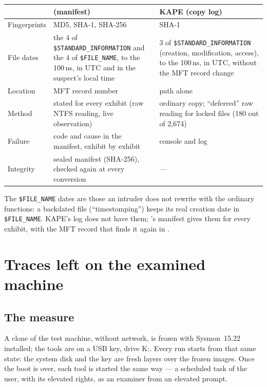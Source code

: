 \documentclass[11pt,a4paper,oneside]{report}
\begin{document}
\begin{longtable}{@{}L{3.6cm}L{6.0cm}L{5.4cm}@{}}
\toprule
 & \textbf{\wac{} (manifest)} & \textbf{KAPE (copy log)} \\
\midrule\endhead
Fingerprints & MD5, SHA-1, SHA-256 & SHA-1 \\
File dates & the 4 of \texttt{\$STANDARD\_INFORMATION} and the 4 of
  \texttt{\$FILE\_NAME}, to the 100\,ns, in UTC and in the suspect's local
  time & 3 of \texttt{\$STANDARD\_INFORMATION} (creation, modification,
  access), to the 100\,ns, in UTC, without the MFT record change \\
Location & MFT record number & path alone \\
Method & stated for every exhibit (raw NTFS reading, live observation) &
  ordinary copy; ``deferred'' raw reading for locked files (180 out of 2,674) \\
Failure & code and cause in the manifest, exhibit by exhibit & console and log \\
Integrity & sealed manifest (SHA-256), checked again at every conversion & --- \\
\bottomrule
\end{longtable}

\begin{note}
The \texttt{\$FILE\_NAME} dates are those an intruder does not rewrite with the
ordinary functions: a backdated file (``timestomping'') keeps its real creation
date in \texttt{\$FILE\_NAME}. KAPE's log does not have them; \wac{}'s manifest
gives them for every exhibit, with the MFT record that finds it again in
.
\end{note}

\chapter{Traces left on the examined machine}\label{chap:traces}

\section{The measure}

A clone of the test machine, without network, is frozen with Sysmon~15.22
installed; the tools are on a USB key, drive K:. Every run starts from that
same state: the system disk and the key are fresh layers over the frozen
images. Once the boot is over, each tool is started the same way --- a
scheduled task of the user, with its elevated rights, as an examiner from an
elevated prompt.
\end{document}

